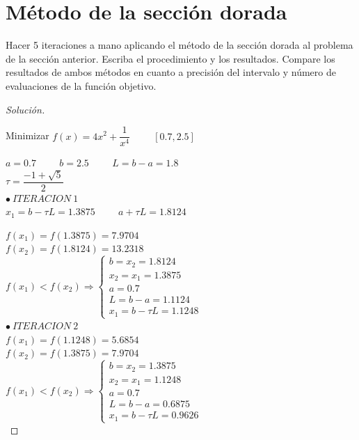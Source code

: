 \documentclass[12pt,oneside]{book}
\newenvironment{solution}{\begin{proof}[Solución]}{\end{proof}}
\begin{document}
\newpage


\section{Método de la sección dorada}
Hacer 5 iteraciones a mano aplicando el método de la sección
dorada al problema de la sección anterior. Escriba el procedimiento y los resultados. Compare los resultados de ambos métodos en cuanto a precisión del
intervalo y número de evaluaciones de la función objetivo.

\begin{solution}
    \begin{center}
		Minimizar $f(x)= 4x^2+\dfrac{1}{x^4} \hspace{1cm} [0.7,2.5]$\\[1cm]	
	\end{center}

	$a=0.7 \hspace{1cm} b=2.5 \hspace{1cm}L=b-a=1.8$\\
	
	$\tau=\dfrac{-1+\sqrt{5}}{2}$\\
	
	$\bullet\ ITERACION\ 1$\\
	
	$x_1=b-\tau L=1.3875 \hspace{1cm} a+\tau L=1.8124$
	
	$f(x_1)=f(1.3875)=7.9704$\\
	$f(x_2)=f(1.8124)=13.2318$\\
	
	$f(x_1)<f(x_2) \Rightarrow \left\{\begin{array}{l}
		b=x_2=1.8124\\
		x_2=x_1=1.3875 \\
		a=0.7 \\
		L=b-a=1.1124 \\
		x_1=b-\tau L=1.1248
	\end{array} \right.$\\[0.5cm]	

	$\bullet\ ITERACION\ 2$\\
	
	$f(x_1)=f(1.1248)=5.6854$\\
	$f(x_2)=f(1.3875)=7.9704$\\
	
	$f(x_1)<f(x_2) \Rightarrow \left\{\begin{array}{l}
		b=x_2=1.3875\\
		x_2=x_1=1.1248 \\
		a=0.7 \\
		L=b-a=0.6875 \\
		x_1=b-\tau L=0.9626
	\end{array} \right.$\\[0.5cm]	


\end{solution}
\end{document}

